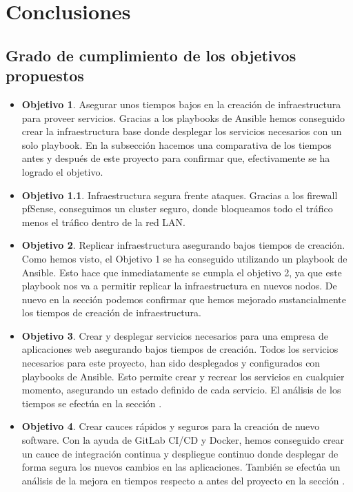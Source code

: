 \chapter {Conclusiones}

\section{Grado de cumplimiento de los objetivos propuestos}
\begin{itemize}
        \item \textbf{Objetivo 1}. Asegurar unos tiempos bajos en la creación de infraestructura para proveer servicios. Gracias a los playbooks de Ansible hemos conseguido crear la infraestructura base donde desplegar los servicios necesarios con un solo playbook. En la subsección  hacemos una comparativa de los tiempos antes y después de este proyecto para confirmar que, efectivamente se ha logrado el objetivo.
        \item \textbf{Objetivo 1.1}. Infraestructura segura frente ataques. Gracias a los firewall pfSense, conseguimos un cluster seguro, donde bloqueamos todo el tráfico menos el tráfico dentro de la red LAN. 
        \item \textbf{Objetivo 2}. Replicar infraestructura asegurando bajos tiempos de creación. Como hemos visto, el Objetivo 1 se ha conseguido utilizando un playbook de Ansible. Esto hace que inmediatamente se cumpla el objetivo 2, ya que este playbook nos va a permitir replicar la infraestructura en nuevos nodos. De nuevo en la sección  podemos confirmar que hemos mejorado sustancialmente los tiempos de creación de infraestructura.
        \item \textbf{Objetivo 3}. Crear y desplegar servicios necesarios para una empresa de aplicaciones web asegurando bajos tiempos de creación. Todos los servicios necesarios para este proyecto, han sido desplegados y configurados con playbooks de Ansible. Esto permite crear y recrear los servicios en cualquier momento, asegurando un estado definido de cada servicio. El análisis de los tiempos se efectúa en la sección .
        \item \textbf{Objetivo 4}. Crear cauces rápidos y seguros para la creación de nuevo software. Con la ayuda de GitLab CI/CD y Docker, hemos conseguido crear un cauce de integración continua y despliegue continuo donde desplegar de forma segura los nuevos cambios en las aplicaciones. También se efectúa un análisis de la mejora en tiempos respecto a antes del proyecto en la sección .
\end{itemize}

